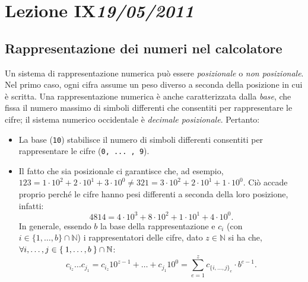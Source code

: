 \chapter[Lezione IX]{Lezione IX\newline\small{\emph{19/05/2011}}}
	\section{Rappresentazione dei numeri nel calcolatore}
Un sistema di rappresentazione numerica può essere \emph{posizionale} o \emph{non posizionale}. Nel primo caso, ogni cifra assume un peso diverso a seconda della posizione in cui è scritta. Una rappresentazione numerica è anche caratterizzata dalla \emph{base}, che fissa il numero massimo di simboli differenti che consentiti per rappresentare le cifre; il sistema numerico occidentale è \emph{decimale posizionale}. Pertanto:
\begin{itemize}
	\item
La base (\lstinline!10!) stabilisce il numero di simboli differenti consentiti per rappresentare le cifre (\lstinline!0, ... , 9!).
	\item
Il fatto che sia posizionale ci garantisce che, ad esempio, $123=1\cdot 10^2+2\cdot 10^1+3\cdot 10^0 \neq 321=3\cdot 10^2+2\cdot 10^1+1\cdot 10^0$. Ciò accade proprio perché le cifre hanno pesi differenti a seconda della loro posizione, infatti:
\[
4814=4\cdot10^3+8\cdot10^2+1\cdot10^1+4\cdot10^0.
\]
In generale, essendo $b$ la base della rappresentazione e $c_i$ (con $i\in\{1,\dots,b\}\cap\mathbb{N}$) i rappresentatori delle cifre, dato $z\in\mathbb{N}$  si ha che, $\forall i,\dots,j\in\Set{1,\dots,b}\cap\mathbb{N}$:
\[
c_{i_z}\dots c_{j_1}=c_{i_z}10^{z-1}+\dots+c_{j_1}10^{0}=\sum_{e=1}^z c_{\{i,\dots,j\}_e}\cdot b^{e-1}.
\]
\end{itemize}

